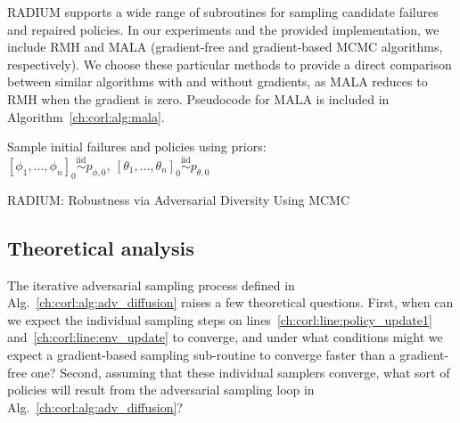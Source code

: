 {RADIUM supports a wide range of subroutines for sampling candidate failures and repaired policies. In our experiments and the provided implementation, we include RMH and MALA (gradient-free and gradient-based MCMC algorithms, respectively). We choose these particular methods to provide a direct comparison between similar algorithms with and without gradients, as MALA reduces to RMH when the gradient is zero. Pseudocode for MALA is included in Algorithm~\ref{ch:corl:alg:mala}.

\begin{algorithm}
    \SetAlgoLined

    Sample initial failures and policies using priors: $[\phi_1, \ldots, \phi_n]_0 \overset{\mathrm{iid}}{\sim} p_{\phi, 0},\ [\theta_1, \ldots, \theta_n]_0 \overset{\mathrm{iid}}{\sim} p_{\theta, 0}$\;



    \caption{RADIUM: Robustness via Adversarial Diversity Using MCMC}\label{ch:corl:alg:adv_diffusion}
\end{algorithm}

\subsection{Theoretical analysis}\label{ch:corl:theory}

The iterative adversarial sampling process defined in Alg.~\ref{ch:corl:alg:adv_diffusion} raises a few theoretical questions. First, when can we expect the individual sampling steps on lines~\ref{ch:corl:line:policy_update1} and~\ref{ch:corl:line:env_update} to converge, and under what conditions might we expect a gradient-based sampling sub-routine to converge faster than a gradient-free one? Second, assuming that these individual samplers converge, what sort of policies will result from the adversarial sampling loop in Alg.~\ref{ch:corl:alg:adv_diffusion}?

}
